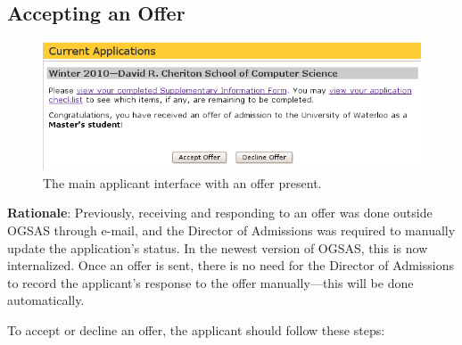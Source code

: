 \documentclass[titlepage]{article}
\begin{document}
\subsection{Accepting an Offer}
\begin{figure}[h!]
  \begin{center}
  \includegraphics[width=13cm]{offer.png}
  \end{center}
  \caption{The main applicant interface with an offer present.}
  \label{yOffer}
\end{figure}

\textbf{Rationale}: Previously, receiving and responding to an offer was done
outside OGSAS through e-mail, and the Director of Admissions was required to
manually update the application's status.  In the newest version of OGSAS,
this is now internalized.  Once an offer is sent, there is no need for the
Director of Admissions to record the applicant's response to the offer
manually---this will be done automatically.

To accept or decline an offer, the applicant should follow these steps:
\end{document}
